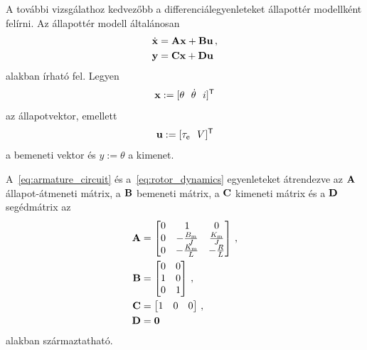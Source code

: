 A további vizsgálathoz kedvezőbb a differenciálegyenleteket állapottér modellként felírni.
Az állapottér modell általánosan~\citep{kalman1963mathematical}
\begin{equation}\label{eq:state_space_generic}
\begin{split}
    \dot{\mathbf{x}} &= \mathbf{A} \mathbf{x} + \mathbf{B} \mathbf{u}\,,\\
    \mathbf{y} &= \mathbf{C} \mathbf{x} + \mathbf{D} \mathbf{u}
\end{split}
\end{equation} 
alakban írható fel. Legyen 
\begin{equation}
	\mathbf{x} := [\theta~~\dot \theta~~i]^{\mathsf T}
\end{equation}
az állapotvektor, emellett
\begin{equation}\label{eq:uinput27}
	\mathbf{u} := [\tau_{\mathrm{e}}~~V]^{\mathsf T}
\end{equation} 
a bemeneti vektor és \(y := \theta\) a kimenet.

A~\eqref{eq:armature_circuit} és a~\eqref{eq:rotor_dynamics} egyenleteket átrendezve 
az  \(\mathbf{A}\) \alert{állapot-átmeneti mátrix}, a \(\mathbf{B}\) bemeneti mátrix, a \(\mathbf{C}\) kimeneti mátrix és a \(\mathbf{D}\) segédmátrix az 
\begin{equation}\label{eq:state_space}
    \begin{split}
        \mathbf{A} &= 
        \begin{bmatrix}
            0 & 1 & 0 \\
            0 & -\frac{B_{\mathrm{m}}}{J} & \frac{K_{\mathrm{m}}}{J} \\
            0 & -\frac{K_{\mathrm{m}}}{L} & -\frac{R}{L} \\
        \end{bmatrix}\,,\\
        \mathbf{B} &=
        \begin{bmatrix}
            0 & 0 \\
            1 & 0 \\
            0 & 1 \\
        \end{bmatrix}\,,\\
        \mathbf{C} &=
        \begin{bmatrix}
            1 & 0 & 0 \\
        \end{bmatrix}\,,\\
        \mathbf{D} &= \mathbf{0}
    \end{split}
\end{equation}
alakban származtatható. 

